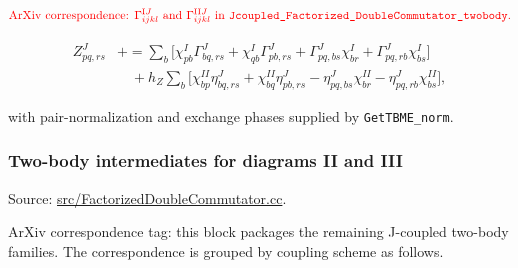 \documentclass[
]{article}
\begin{document}
\begin{equation}
{\color{red}\text{ArXiv correspondence: }\Gamma^{\mathrm{I}J}_{ijkl}\text{ and }\Gamma^{\mathrm{II}J}_{ijkl}\text{ in }\texttt{Jcoupled\_Factorized\_DoubleCommutator\_twobody}.}
\end{equation}

\begin{equation}
\begin{aligned}
Z^{J}_{pq,rs} &\mathrel{+}=
\sum_b\Big[
\chi^I_{pb}\Gamma^J_{bq,rs}
+\chi^I_{qb}\Gamma^J_{pb,rs}
+\Gamma^J_{pq,bs}\chi^I_{br}
+\Gamma^J_{pq,rb}\chi^I_{bs}
\Big] \\
&\quad
+h_Z\sum_b\Big[
\chi^{II}_{bp}\eta^J_{bq,rs}
+\chi^{II}_{bq}\eta^J_{pb,rs}
-\eta^J_{pq,bs}\chi^{II}_{br}
-\eta^J_{pq,rb}\chi^{II}_{bs}
\Big],
\end{aligned}
\end{equation}

with pair-normalization and exchange phases supplied by
\texttt{GetTBME\_norm}.

\subsubsection{Two-body intermediates for diagrams II and
III}\label{two-body-intermediates-for-diagrams-ii-and-iii}

Source:
\href{../src/FactorizedDoubleCommutator.cc\#L1151-L3049}{src/FactorizedDoubleCommutator.cc}.

ArXiv correspondence tag: this block packages the remaining J-coupled
two-body families. The correspondence is grouped by coupling scheme as
follows.
\end{document}
